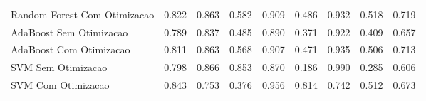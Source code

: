 \begin{table}[H]
\begin{adjustwidth}{ -1in }{ -1in }
\begin{tabular}{lrrrrrrrr}
      Random Forest Com Otimizacao &                        0.822 &                         0.863 &                            0.582 &                            0.909 &                          0.486 &                          0.932 &                                     0.518 &                                 0.719 \\
           AdaBoost Sem Otimizacao &                        0.789 &                         0.837 &                            0.485 &                            0.890 &                          0.371 &                          0.922 &                                     0.409 &                                 0.657 \\
           AdaBoost Com Otimizacao &                        0.811 &                         0.863 &                            0.568 &                            0.907 &                          0.471 &                          0.935 &                                     0.506 &                                 0.713 \\
                SVM Sem Otimizacao &                        0.798 &                         0.866 &                            0.853 &                            0.870 &                          0.186 &                          0.990 &                                     0.285 &                                 0.606 \\
                SVM Com Otimizacao &                        0.843 &                         0.753 &                            0.376 &                            0.956 &                          0.814 &                          0.742 &                                     0.512 &                                 0.673 \\
\bottomrule
\end{tabular}
    \end{adjustwidth}
    \renewcommand{\arraystretch}{1.0} %
\end{table}
